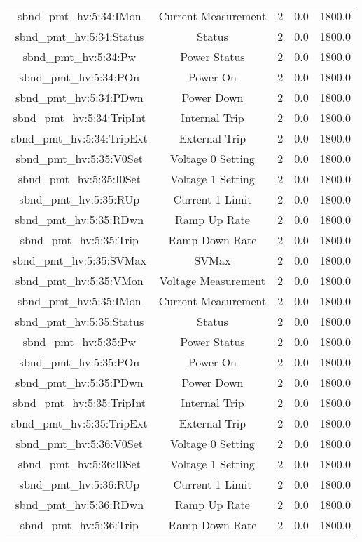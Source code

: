 \begin{center}
\begin{longtable}{c | c c c c }
sbnd\_pmt\_hv:5:34:IMon & Current Measurement & 2 & 0.0 & 1800.0\\ 
sbnd\_pmt\_hv:5:34:Status & Status & 2 & 0.0 & 1800.0\\ 
sbnd\_pmt\_hv:5:34:Pw & Power Status & 2 & 0.0 & 1800.0\\ 
sbnd\_pmt\_hv:5:34:POn & Power On & 2 & 0.0 & 1800.0\\ 
sbnd\_pmt\_hv:5:34:PDwn & Power Down & 2 & 0.0 & 1800.0\\ 
sbnd\_pmt\_hv:5:34:TripInt & Internal Trip & 2 & 0.0 & 1800.0\\ 
sbnd\_pmt\_hv:5:34:TripExt & External Trip & 2 & 0.0 & 1800.0\\ 
sbnd\_pmt\_hv:5:35:V0Set & Voltage 0 Setting & 2 & 0.0 & 1800.0\\ 
sbnd\_pmt\_hv:5:35:I0Set & Voltage 1 Setting & 2 & 0.0 & 1800.0\\ 
sbnd\_pmt\_hv:5:35:RUp & Current 1 Limit & 2 & 0.0 & 1800.0\\ 
sbnd\_pmt\_hv:5:35:RDwn & Ramp Up Rate & 2 & 0.0 & 1800.0\\ 
sbnd\_pmt\_hv:5:35:Trip & Ramp Down Rate & 2 & 0.0 & 1800.0\\ 
sbnd\_pmt\_hv:5:35:SVMax & SVMax & 2 & 0.0 & 1800.0\\ 
sbnd\_pmt\_hv:5:35:VMon & Voltage Measurement & 2 & 0.0 & 1800.0\\ 
sbnd\_pmt\_hv:5:35:IMon & Current Measurement & 2 & 0.0 & 1800.0\\ 
sbnd\_pmt\_hv:5:35:Status & Status & 2 & 0.0 & 1800.0\\ 
sbnd\_pmt\_hv:5:35:Pw & Power Status & 2 & 0.0 & 1800.0\\ 
sbnd\_pmt\_hv:5:35:POn & Power On & 2 & 0.0 & 1800.0\\ 
sbnd\_pmt\_hv:5:35:PDwn & Power Down & 2 & 0.0 & 1800.0\\ 
sbnd\_pmt\_hv:5:35:TripInt & Internal Trip & 2 & 0.0 & 1800.0\\ 
sbnd\_pmt\_hv:5:35:TripExt & External Trip & 2 & 0.0 & 1800.0\\ 
sbnd\_pmt\_hv:5:36:V0Set & Voltage 0 Setting & 2 & 0.0 & 1800.0\\ 
sbnd\_pmt\_hv:5:36:I0Set & Voltage 1 Setting & 2 & 0.0 & 1800.0\\ 
sbnd\_pmt\_hv:5:36:RUp & Current 1 Limit & 2 & 0.0 & 1800.0\\ 
sbnd\_pmt\_hv:5:36:RDwn & Ramp Up Rate & 2 & 0.0 & 1800.0\\ 
sbnd\_pmt\_hv:5:36:Trip & Ramp Down Rate & 2 & 0.0 & 1800.0\\ 

\end{longtable}
\end{center}
